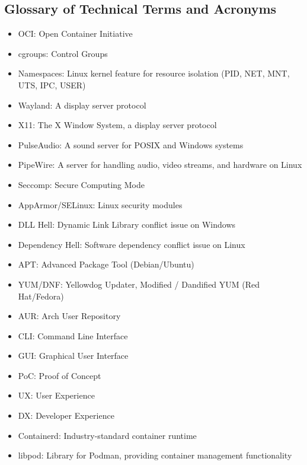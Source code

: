 \documentclass[journal,onecolumn]{IEEEtran}
\begin{document}
\subsection{Glossary of Technical Terms and Acronyms}
\begin{itemize}
    \item OCI: Open Container Initiative
    \item cgroups: Control Groups
    \item Namespaces: Linux kernel feature for resource isolation (PID, NET, MNT, UTS, IPC, USER)
    \item Wayland: A display server protocol
    \item X11: The X Window System, a display server protocol
    \item PulseAudio: A sound server for POSIX and Windows systems
    \item PipeWire: A server for handling audio, video streams, and hardware on Linux
    \item Seccomp: Secure Computing Mode
    \item AppArmor/SELinux: Linux security modules
    \item DLL Hell: Dynamic Link Library conflict issue on Windows
    \item Dependency Hell: Software dependency conflict issue on Linux
    \item APT: Advanced Package Tool (Debian/Ubuntu)
    \item YUM/DNF: Yellowdog Updater, Modified / Dandified YUM (Red Hat/Fedora)
    \item AUR: Arch User Repository
    \item CLI: Command Line Interface
    \item GUI: Graphical User Interface
    \item PoC: Proof of Concept
    \item UX: User Experience
    \item DX: Developer Experience
    \item Containerd: Industry-standard container runtime
    \item libpod: Library for Podman, providing container management functionality
\end{itemize}
\end{document}
